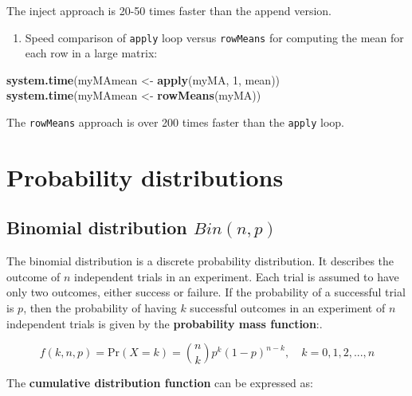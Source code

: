 \documentclass[]{article}
\def\tightlist{}
\newenvironment{Shaded}{\begin{snugshade}}{\end{snugshade}}
\newcommand{\KeywordTok}[1]{\textcolor[rgb]{0.13,0.29,0.53}{\textbf{{#1}}}}
\newcommand{\DecValTok}[1]{\textcolor[rgb]{0.00,0.00,0.81}{{#1}}}
\newcommand{\StringTok}[1]{\textcolor[rgb]{0.31,0.60,0.02}{{#1}}}
\newcommand{\NormalTok}[1]{{#1}}
\numberwithin{equation}{section}
\begin{document}
The inject approach is 20-50 times faster than the append version.

\begin{enumerate}
\def\labelenumi{\arabic{enumi}.}
\setcounter{enumi}{1}
\tightlist
\item
  Speed comparison of \texttt{apply} loop versus \texttt{rowMeans} for
  computing the mean for each row in a large matrix:
\end{enumerate}

\begin{Shaded}
\begin{Highlighting}[]
\KeywordTok{system.time}\NormalTok{(myMAmean <-}\StringTok{ }\KeywordTok{apply}\NormalTok{(myMA, }\DecValTok{1}\NormalTok{, mean))}
\KeywordTok{system.time}\NormalTok{(myMAmean <-}\StringTok{ }\KeywordTok{rowMeans}\NormalTok{(myMA))}
\end{Highlighting}
\end{Shaded}

The \texttt{rowMeans} approach is over 200 times faster than the
\texttt{apply} loop.

\section{Probability distributions}\label{probability-distributions}

\subsection{\texorpdfstring{Binomial distribution
\(Bin(n,p)\)}{Binomial distribution Bin(n,p)}}\label{binomial-distribution-binnp}

The binomial distribution is a discrete probability distribution. It
describes the outcome of \(n\) independent trials in an experiment. Each
trial is assumed to have only two outcomes, either success or failure.
If the probability of a successful trial is \(p\), then the probability
of having \(k\) successful outcomes in an experiment of \(n\)
independent trials is given by the \textbf{probability mass function}:.

\[
f(k,n,p) = \mbox{Pr}(X=k)=\binom{n}{k} p^k (1-p)^{n-k}, \quad k=0,1,2,...,n
\]

The \textbf{cumulative distribution function} can be expressed as:
\end{document}
